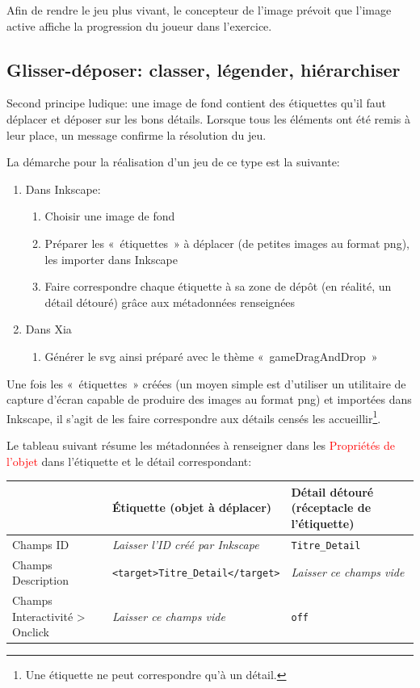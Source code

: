 \documentclass[a4paper,12pt]{report}
\newcommand{\chemin}[1]{\textcolor{red}{#1}}
\begin{document}
Afin de rendre le jeu plus vivant, le concepteur de l'image prévoit que l'image 
active affiche la progression du joueur dans l'exercice.

\subsection{Glisser-déposer: classer, légender, hiérarchiser}

Second principe ludique: une image de fond contient des étiquettes qu'il faut déplacer et 
déposer sur les bons détails. Lorsque tous les éléments ont été remis à leur place, un message 
confirme la résolution du jeu.

La démarche pour la réalisation d'un jeu de ce type est la suivante:
\begin{enumerate}
 \item Dans Inkscape:
\begin{enumerate}
 \item Choisir une image de fond
 \item Préparer les «~étiquettes~» à déplacer (de petites images au format png), 
 les importer dans Inkscape
 \item Faire correspondre chaque étiquette à sa zone de dépôt (en réalité, un détail détouré)
 grâce aux métadonnées renseignées
\end{enumerate}
 \item Dans Xia
 \begin{enumerate}
  \item Générer le svg ainsi préparé avec le thème «~gameDragAndDrop~»
 \end{enumerate}
\end{enumerate}

Une fois les «~étiquettes~» créées (un moyen simple est d'utiliser un utilitaire de capture d'écran 
capable de produire des images au format png) et importées dans Inkscape, il s'agit de les faire 
correspondre aux détails censés les accueillir\footnote{Une étiquette ne peut correspondre qu'à un détail.}.

Le tableau suivant résume les métadonnées à renseigner dans les \chemin{Propriétés de l'objet}
dans l'étiquette et le détail correspondant:

\begin{center}
\begin{tabular}{|p{}|p{2.5in}|p{1.5in}|}
\hline
 & Étiquette (objet à déplacer) & Détail détouré (réceptacle de l'étiquette)\\
\hline
Champs ID & \textit{Laisser l'ID créé par Inkscape} & \verb|Titre_Detail|\\
\hline
Champs Description & \verb|<target>Titre_Detail</target>| & \textit{Laisser ce champs vide}\\
\hline
Champs Interactivité > Onclick & \textit{Laisser ce champs vide}& \verb|off|\\
\hline
\end{tabular}
\end{center}
\end{document}
